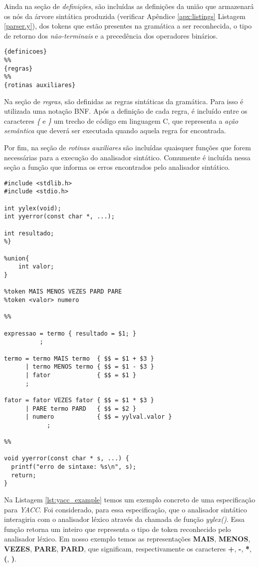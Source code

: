Ainda na seção de \emph{definições}, são incluídas as definições da união que
armazenará os nós da árvore sintática produzida (verificar Apêndice
\ref{apx:listings} Listagem \ref{parser.y}), dos tokens que estão presentes na
gramática a ser reconhecida, o tipo de retorno dos \emph{não-terminais} e a
precedência dos operadores binários.

\begin{lstlisting}[label=lst:yacc_file_format, caption=Formato Especificação YACC]
{definicoes}
%%
{regras}
%%
{rotinas auxiliares}
\end{lstlisting}

Na seção de \emph{regras}, são definidas as regras sintáticas da gramática.
Para isso é utilizada uma notação BNF. Após a definição de cada regra, é
incluído entre os caracteres \emph{\{} e \emph{\}} um trecho de código em
linguagem C, que representa a \emph{ação semântica} que deverá ser executada
quando aquela regra for encontrada.

Por fim, na seção de \emph{rotinas auxiliares} são incluídas quaisquer funções
que forem necessárias para a execução do analisador sintático. Comumente é
incluída nessa seção a função que informa os erros encontrados pelo analisador
sintático.

\begin{lstlisting}[label=lst:yacc_example, caption=Exemplo de especificação
YACC]
%{
#include <stdlib.h>
#include <stdio.h>

int yylex(void);
int yyerror(const char *, ...);

int resultado;
%}

%union{
	int valor;
}

%token MAIS MENOS VEZES PARD PARE
%token <valor> numero

%%

expressao = termo { resultado = $1; }
          ;

termo = termo MAIS termo  { $$ = $1 + $3 }
      | termo MENOS termo { $$ = $1 - $3 }
      | fator             { $$ = $1 }
      ;

fator = fator VEZES fator { $$ = $1 * $3 }
      | PARE termo PARD   { $$ = $2 }
      | numero            { $$ = yylval.valor }
			;

%%

void yyerror(const char * s, ...) {
  printf("erro de sintaxe: %s\n", s);
  return;
}
\end{lstlisting}

Na Listagem \ref{lst:yacc_example} temos um exemplo concreto de uma
especificação para \emph{YACC}. Foi considerado, para essa especificação, que
o analisador sintático interagiria com o analisador léxico através da chamada
de função \emph{yylex()}. Essa função retorna um inteiro que representa o tipo
de token reconhecido pelo analisador léxico. Em nosso exemplo temos as
representações \textbf{MAIS}, \textbf{MENOS}, \textbf{VEZES}, \textbf{PARE},
\textbf{PARD}, que significam, respectivamente os caracteres \textbf{+},
\textbf{-}, \textbf{*}, \textbf{(}, \textbf{)}.

